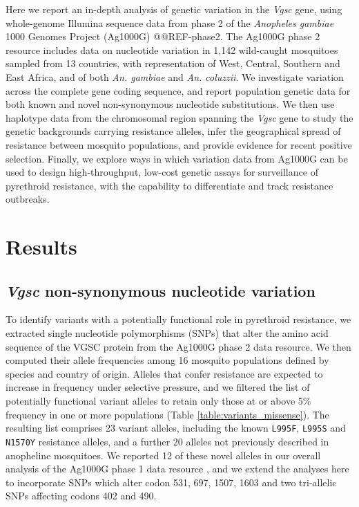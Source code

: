 \documentclass[a4paper,11pt,abstracton,hidelinks]{scrartcl}
\begin{document}
Here we report an in-depth analysis of genetic variation in the \textit{Vgsc} gene, using whole-genome Illumina sequence data from phase 2 of the \emph{Anopheles gambiae} 1000 Genomes Project (Ag1000G) \cite{Ag1000gConsortium2017}@@REF-phase2.
%
The Ag1000G phase 2 resource includes data on nucleotide variation in 1,142 wild-caught mosquitoes sampled from 13 countries, with representation of West, Central, Southern and East Africa, and of both \textit{An. gambiae} and \textit{An. coluzzii}.
%
We investigate variation across the complete gene coding sequence, and report population genetic data for both known and novel non-synonymous nucleotide substitutions.
%
We then use haplotype data from the chromosomal region spanning the \textit{Vgsc} gene to study the genetic backgrounds carrying resistance alleles, infer the geographical spread of resistance between mosquito populations, and provide evidence for recent positive selection.
%
Finally, we explore ways in which variation data from Ag1000G can be used to design high-throughput, low-cost genetic assays for surveillance of pyrethroid resistance, with the capability to differentiate and track resistance outbreaks.




\section*{Results}


\subsection*{\textit{Vgsc} non-synonymous nucleotide variation}


%
To identify variants with a potentially functional role in pyrethroid resistance, we extracted single nucleotide polymorphisms (SNPs) that alter the amino acid sequence of the VGSC protein from the Ag1000G phase 2 data resource.
%
We then computed their allele frequencies among 16 mosquito populations defined by species and country of origin.
%
Alleles that confer resistance are expected to increase in frequency under selective pressure, and we filtered the list of potentially functional variant alleles to retain only those at or above 5\% frequency in one or more populations (Table \ref{table:variants_missense}).
%
The resulting list comprises 23 variant alleles, including the known \texttt{L995F}, \texttt{L995S} and \texttt{N1570Y} resistance alleles, and a further 20 alleles not previously described in anopheline mosquitoes.
%
We reported 12 of these novel alleles in our overall analysis of the Ag1000G phase 1 data resource \cite{Ag1000gConsortium2017}, and we extend the analyses here to incorporate SNPs which alter codon 531, 697, 1507, 1603 and two tri-allelic SNPs affecting codons 402 and 490.
\end{document}
